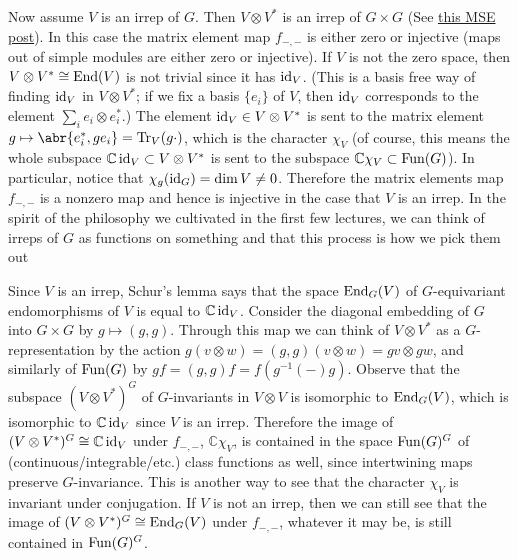 \documentclass[../../rtnotes.tex]{subfiles}
\begin{document}
Now assume $V$ is an irrep of $G$. Then $V\otimes V^\ast$ is an irrep of $G\times G$ (See \href{https://math.stackexchange.com/questions/5013533/proof-that-boxtimes-of-irreducible-representations-is-again-irreducible}{this MSE post}). In this case the matrix element map $f_{-,-}$ is either zero or injective (maps out of simple modules are either zero or injective). If $V$ is not the zero space, then $V\otimes V^\ast\cong \operatorname{End}(V)$ is not trivial since it has $\operatorname{id}_V$. (This is a basis free way of finding $\operatorname{id}_V$ in $V\otimes V^\ast$; if we fix a basis $\{e_i\}$ of $V$, then $\operatorname{id}_V$ corresponds to the element $\sum_i e_i\otimes e_i^\ast$.) The element $\operatorname{id}_V\in V\otimes V^\ast$ is sent to the matrix element $g\mapsto \abr{e_i^\ast,ge_i} = \Tr_V(g\cdot)$, which is the character $\chi_V$ (of course, this means the whole subspace $\mathbb C\operatorname{id}_V\subset V\otimes V^\ast$ is sent to the subspace $\mathbb C\chi_V\subset \operatorname{Fun}(G)$). In particular, notice that $\chi_g(\operatorname{id}_G) = \dim V\neq 0$. Therefore the matrix elements map $f_{-,-}$ is a nonzero map and hence is injective in the case that $V$ is an irrep. In the spirit of the philosophy we cultivated in the first few lectures, we can think of irreps of $G$ as functions on something  and that this process is how we pick them out

Since $V$ is an irrep, Schur's lemma says that the space $\operatorname{End}_G(V)$ of $G$-equivariant endomorphisms of $V$ is equal to $\mathbb C\operatorname{id}_V$. Consider the diagonal embedding of $G$ into $G\times G$ by $g\mapsto (g,g)$. Through this map we can think of $V\otimes V^\ast$ as a $G$-representation by the action $g(v\otimes w) = (g,g)(v\otimes w) = gv\otimes gw$, and similarly of $\operatorname{Fun}(G)$ by $gf = (g,g)f = f(g^{-1}(-)g)$. Observe that the subspace $(V\otimes V^\ast)^G$ of $G$-invariants in $V\otimes V$ is isomorphic to $\operatorname{End}_G(V)$, which is isomorphic to $\mathbb C\operatorname{id}_V$ since $V$ is an irrep. Therefore the image of $(V\otimes V^\ast)^G\cong \mathbb C\operatorname{id}_V$ under $f_{-,-}$, $\mathbb C\chi_V$, is contained in the space $\operatorname{Fun}(G)^G$ of (continuous/integrable/etc.) class functions as well, since intertwining maps preserve $G$-invariance. This is another way to see that the character $\chi_V$ is invariant under conjugation. If $V$ is not an irrep, then we can still see that the image of $(V\otimes V^\ast)^G\cong \operatorname{End}_G(V)$ under $f_{-,-}$, whatever it may be, is still contained in $\operatorname{Fun}(G)^G$.
\end{document}
